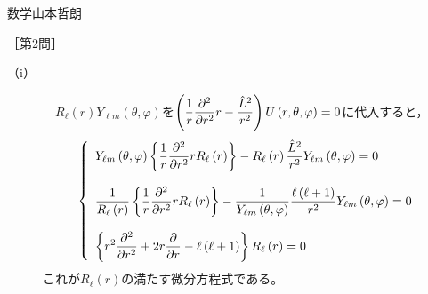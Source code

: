 \documentclass[fleqn]{jbook}
\begin{document}
\begin{answer}{数学}{山本哲朗}
\begin{description}
    \end{description}

\newpage


\setcounter{equation}{0}

［第2問］\\


    \begin{description}
        \item[{\rm （i）}] 　$R_\ell\left( r \right)Y_{\ell m}\left( \theta,\varphi \right)$を$\displaystyle \left( {\frac{1}{r}\frac{{\partial ^2 }}{{\partial r^2 }}r - \frac{{\hat L^2 }}{{r^2 }}} \right)U\left( {r,\theta ,\varphi } \right) = 0$に代入すると，
\begin{equation}
\left\{ {\begin{array}{*{20}l}
   {\ds Y_{\ell m}\left( \theta,\varphi \right)\left\{ \frac{1}{r}\frac{\partial^2}{\partial r^2}rR_\ell\left( r \right)\right\} -R_\ell\left( r \right)\frac{\hat{L}^2}{r^2}Y_{\ell m}\left( \theta,\varphi \right)=0}  \\
   \cr
   {\ds \frac{1}{R_\ell\left( r \right)}\left\{\frac{1}{r}\frac{\partial^2}{\partial r^2}rR_\ell\left( r \right)\right\}-\frac{1}{Y_{\ell m}\left( \theta,\varphi \right)}\frac{\ell\left(\ell+1\right)}{r^2}Y_{\ell m}\left( \theta,\varphi \right)=0}  \\
   \cr
   {\ds \left\{ r^2\frac{\partial^2}{\partial r^2}+2r\frac{\partial}{\partial r}-\ell\left(\ell +1\right)\right\}R_\ell\left( r \right)=0}  \\
\end{array}} \right.
\end{equation}
これが$R_\ell\left( r \right)$の満たす微分方程式である。\\
        

\end{description}
\end{answer}
\end{document}
